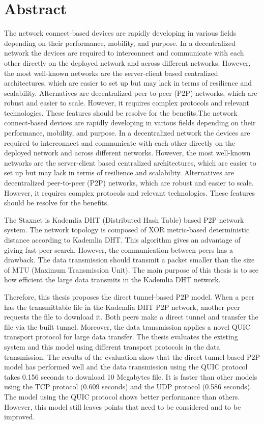 \chapter*{Abstract}
\label{cha:abstract}

The network connect-based devices are rapidly developing in various fields depending on their performance, mobility, and purpose. In a decentralized network the devices are required to interconnect and communicate with each other directly on the deployed network and across different networks. However, the most well-known networks are the server-client based centralized architectures, which are easier to set up but may lack in terms of resilience and scalability. Alternatives are decentralized peer-to-peer (P2P) networks, which are robust and easier to scale. However, it requires complex protocols and relevant technologies. These features should be resolve for the benefits.The network connect-based devices are rapidly developing in various fields depending on their performance, mobility, and purpose. In a decentralized network the devices are required to interconnect and communicate with each other directly on the deployed network and across different networks. However, the most well-known networks are the server-client based centralized architectures, which are easier to set up but may lack in terms of resilience and scalability. Alternatives are decentralized peer-to-peer (P2P) networks, which are robust and easier to scale. However, it requires complex protocols and relevant technologies. These features should be resolve for the benefits.
 
The Staxnet is Kademlia DHT (Distributed Hash Table) based P2P network system. The network topology is composed of XOR metric-based deterministic distance according to Kademlia DHT. This algorithm gives an advantage of giving fast peer search. However, the communication between peers has a drawback. The data transmission should transmit a packet smaller than the size of MTU (Maximum Transmission Unit). The main purpose of this thesis is to see how efficient the large data transmits in the Kademlia DHT network.

Therefore, this thesis proposes the direct tunnel-based P2P model. When a peer has the transmittable file in the Kademlia DHT P2P network, another peer requests the file to download it. Both peers make a direct tunnel and transfer the file via the built tunnel. Moreover, the data transmission applies a novel QUIC transport protocol for large data transfer. The thesis evaluates the existing system and this model using different transport protocols in the data transmission. The results of the evaluation show that the direct tunnel based P2P model has performed well and the data transmission using the QUIC protocol takes 0.156 seconds to download 10 Megabytes file. It is faster than other models using the TCP protocol (0.609 seconds) and the UDP protocol (0.586 seconds). The model using the QUIC protocol shows better performance than others. However, this model still leaves points that need to be considered and to be improved.
